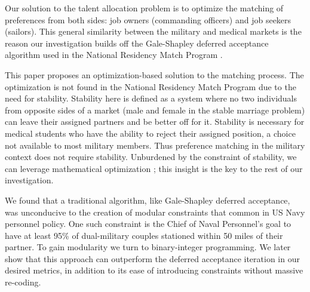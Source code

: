 Our solution to the talent allocation problem is to optimize the matching of preferences from both sides: job owners (commanding officers) and job seekers (sailors). This general similarity between the military and medical  markets is the reason our investigation builds off the Gale-Shapley deferred acceptance algorithm used in the National Residency Match Program \citep{1962_Gale}. 

This paper proposes an optimization-based solution to the matching process. The optimization is not found in the National Residency Match Program due to the need for stability. Stability here is defined as a system where no two individuals from opposite sides of a market (male and female in the stable marriage problem) can leave their assigned partners and be better off for it. Stability is necessary for  medical students who have the ability to reject their assigned position, a choice not available to most military members. Thus preference matching in the military context does not require stability. Unburdened by the constraint of stability, we can leverage mathematical optimization \citep{1984_Roth} \citep{1985_Roth_b} \citep{1989_Roth}; this insight is the key to the rest of our investigation. 

We found that a traditional algorithm, like Gale-Shapley deferred acceptance, was unconducive to the creation of modular constraints that common in US Navy personnel policy. One such constraint is the Chief of Naval Personnel's goal to have at least 95\% of dual-military couples stationed within 50 miles of their partner. To gain modularity we turn to binary-integer programming.  We later show that this approach can outperform the deferred acceptance iteration in our desired metrics, in addition to its ease of introducing constraints without massive re-coding. 
